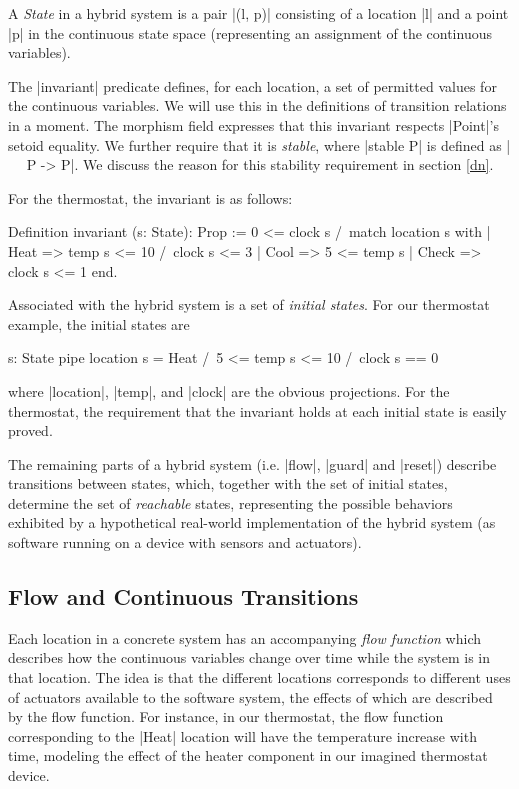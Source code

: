 \documentclass[runningheads]{llncs}
\begin{document}
A \emph{State} in a hybrid system is a pair |(l, p)| consisting of a location |l| and a point |p| in the continuous state space (representing an assignment of the continuous variables).

The |invariant| predicate defines, for each location, a set of permitted values for the continuous variables. We will use this in the definitions of transition relations in a moment. The morphism field expresses that this invariant respects |Point|'s setoid equality. We further require that it is \emph{stable}, where |stable P| is defined as |~ ~P -> P|. We discuss the reason for this stability requirement in section \ref{dn}.

For the thermostat, the invariant is as follows:
\begin{code}
Definition invariant (s: State): Prop :=
  0 <= clock s /\
  match location s with
  | Heat => temp s <= 10 /\ clock s <= 3
  | Cool => 5 <= temp s
  | Check => clock s <= 1
  end.
\end{code}

Associated with the hybrid system is a set of \emph{initial states}. For our thermostat example, the initial states are
\begin{code}
  {s: State pipe location s = Heat /\ 5 <= temp s <= 10 /\ clock s == 0}
\end{code}
where |location|, |temp|, and |clock| are the obvious projections. For the thermostat, the requirement that the invariant holds at each initial state is easily proved.

The remaining parts of a hybrid system (i.e. |flow|, |guard| and |reset|) describe transitions between states, which, together with the set of initial states, determine the set of \emph{reachable} states, representing the possible behaviors exhibited by a hypothetical real-world implementation of the hybrid system (as software running on a device with sensors and actuators).

\subsection{Flow and Continuous Transitions}
\label{concreteflow}

Each location in a concrete system has an accompanying \emph{flow function} which describes how the continuous variables change over time while the system is in that location. The idea is that the different locations corresponds to different uses of actuators available to the software system, the effects of which are described by the flow function. For instance, in our thermostat, the flow function corresponding to the |Heat| location will have the temperature increase with time, modeling the effect of the heater component in our imagined thermostat device.
\end{document}
